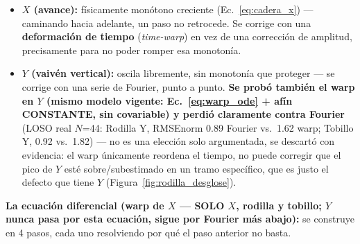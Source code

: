 \documentclass[11pt,a4paper]{scrartcl}
\begin{document}
\begin{itemize}
\item \textbf{$X$ (avance):} físicamente monótono creciente (Ec.~\ref{eq:cadera_x}) --- caminando hacia adelante, un paso no retrocede. Se corrige con una \textbf{deformación de tiempo} (\emph{time-warp}) en vez de una corrección de amplitud, precisamente para no poder romper esa monotonía.
\item \textbf{$Y$ (vaivén vertical):} oscila libremente, sin monotonía que proteger --- se corrige con una serie de Fourier, punto a punto. \textbf{Se probó también el warp en $Y$ (mismo modelo vigente: Ec.~\ref{eq:warp_ode} + afín CONSTANTE, sin covariable) y perdió claramente contra Fourier} (LOSO real $N$=44: Rodilla Y, RMSEnorm 0.89 Fourier vs.\ 1.62 warp; Tobillo Y, 0.92 vs.\ 1.82) --- no es una elección solo argumentada, se descartó con evidencia: el warp únicamente reordena el tiempo, no puede corregir que el pico de $Y$ esté sobre/subestimado en un tramo específico, que es justo el defecto que tiene $Y$ (Figura~\ref{fig:rodilla_desglose}).
\end{itemize}

\textbf{La ecuación diferencial (warp de $X$ --- SOLO $X$, rodilla y tobillo; $Y$ nunca pasa por esta ecuación, sigue por Fourier más abajo):} se construye en 4 pasos, cada uno resolviendo por qué el paso anterior no basta.
\end{document}
